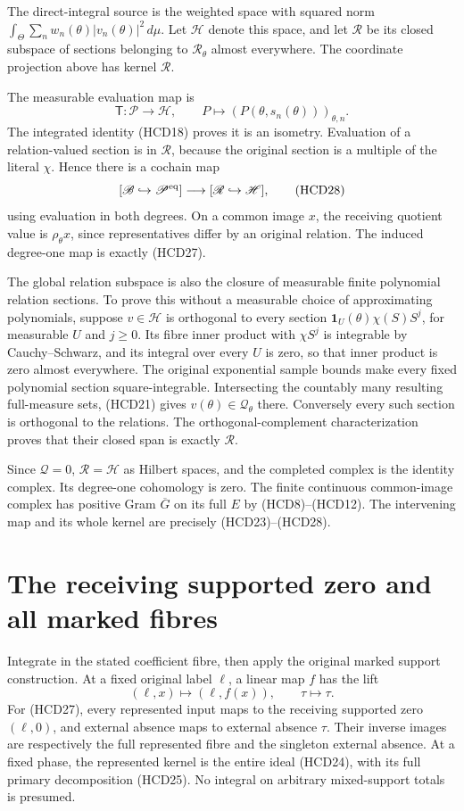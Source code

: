 The direct-integral source is the weighted space with squared
norm $\int_\Theta\sum_n w_n(\theta)|v_n(\theta)|^2\,d\mu$.
Let $\mathscr H$ denote this space, and let $\mathscr R$
be its closed subspace of sections belonging to
$\mathcal R_\theta$ almost everywhere. The coordinate
projection above has kernel $\mathscr R$.

The measurable evaluation map is
\[
 \mathsf T:\mathscr P\longrightarrow\mathscr H,\qquad
 P\longmapsto(P(\theta,s_n(\theta)))_{\theta,n}.
\]
The integrated identity (HCD18) proves it is an isometry.
Evaluation of a relation-valued section is in $\mathscr R$,
because the original section is a multiple of the literal
$\chi$. Hence there is a cochain map
\[
 [\mathscr B\hookrightarrow\mathscr P^{\rm eq}]
 \longrightarrow[\mathscr R\hookrightarrow\mathscr H],
 \tag{HCD28}
\]
using evaluation in both degrees. On a common image $x$,
the receiving quotient value is $\rho_\theta x$, since
representatives differ by an original relation.
The induced degree-one map is exactly (HCD27).

The global relation subspace is also the closure of measurable
finite polynomial relation sections. To prove this without
a measurable choice of approximating polynomials, suppose
$v\in\mathscr H$ is orthogonal to every section
$\mathbf1_U(\theta)\chi(S)S^j$, for measurable $U$ and $j\ge0$.
Its fibre inner product with $\chi S^j$ is integrable by
Cauchy--Schwarz, and its integral over every $U$ is zero,
so that inner product is zero almost everywhere.
The original exponential sample bounds make every fixed
polynomial section square-integrable.
Intersecting the countably many resulting full-measure sets,
(HCD21) gives $v(\theta)\in\mathcal Q_\theta$ there.
Conversely every such section is orthogonal to the relations.
The orthogonal-complement characterization proves that their
closed span is exactly $\mathscr R$.

Since $\mathscr Q=0$, $\mathscr R=\mathscr H$ as Hilbert
spaces, and the completed complex is the identity complex.
Its degree-one cohomology is zero. The finite continuous
common-image complex has positive Gram $\overline G$
on its full $E$ by (HCD8)--(HCD12).
The intervening map and its whole kernel are precisely
(HCD23)--(HCD28).

\section{The receiving supported zero and all marked fibres}

Integrate in the stated coefficient fibre, then apply the
original marked support construction. At a fixed original
label $\ell$, a linear map $f$ has the lift
\[
 (\ell,x)\longmapsto(\ell,f(x)),\qquad
 \tau\longmapsto\tau.
 \tag{HCD29}
\]
For (HCD27), every represented input maps to the receiving
supported zero $(\ell,0)$, and external absence maps to
external absence $\tau$. Their inverse images are respectively
the full represented fibre and the singleton external absence.
At a fixed phase, the represented kernel is the entire
ideal (HCD24), with its full primary decomposition (HCD25).
No integral on arbitrary mixed-support totals is presumed.

